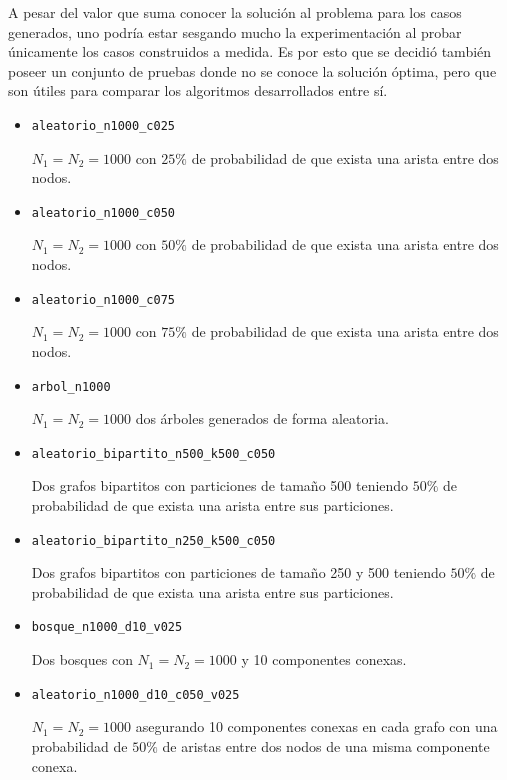 A pesar del valor que suma conocer la solución al problema para los casos
generados, uno podría estar sesgando mucho la experimentación al probar
únicamente los casos construidos a medida. Es por esto que se decidió también
poseer un conjunto de pruebas donde no se conoce la solución óptima, pero que
son útiles para comparar los algoritmos desarrollados entre sí.

\begin{itemize}
	\item \texttt{aleatorio\_n1000\_c025}

		$N_1 = N_2 = 1000$ con $25\%$ de probabilidad de que exista una arista
		entre dos nodos.
	\item \texttt{aleatorio\_n1000\_c050}

		$N_1 = N_2 = 1000$ con $50\%$ de probabilidad de que exista una arista
		entre dos nodos.
	\item \texttt{aleatorio\_n1000\_c075}

		$N_1 = N_2 = 1000$ con $75\%$ de probabilidad de que exista una arista
		entre dos nodos.
	\item \texttt{arbol\_n1000}

		$N_1 = N_2 = 1000$ dos árboles generados de forma aleatoria.
	\item \texttt{aleatorio\_bipartito\_n500\_k500\_c050}

		Dos grafos bipartitos con particiones de tamaño 500 teniendo $50\%$ de
		probabilidad de que exista una arista entre sus particiones.
	\item \texttt{aleatorio\_bipartito\_n250\_k500\_c050}

		Dos grafos bipartitos con particiones de tamaño 250 y 500 teniendo $50\%$ de
		probabilidad de que exista una arista entre sus particiones.
	\item \texttt{bosque\_n1000\_d10\_v025}

		Dos bosques con $N_1 = N_2 = 1000$ y 10 componentes conexas.
	\item \texttt{aleatorio\_n1000\_d10\_c050\_v025}

		$N_1 = N_2 = 1000$ asegurando 10 componentes conexas en cada grafo con
		una probabilidad de $50\%$ de aristas entre dos nodos de una misma
		componente conexa.
\end{itemize}
